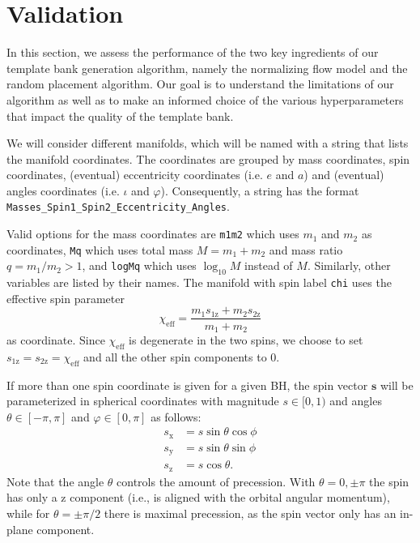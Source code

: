 \documentclass[twocolumn,showpacs,preprintnumbers,nofootinbib,prd,
superscriptaddress,10pt]{revtex4-2}
\begin{document}
\section{Validation} \label{sec:validation}

In this section, we assess the performance of the two key ingredients of our template bank generation algorithm, namely the normalizing flow model and the random placement algorithm.
Our goal is to understand the limitations of our algorithm as well as to make an informed choice of the various hyperparameters that impact the quality of the template bank.

We will consider different manifolds, which will be named with a string that lists the manifold coordinates. The coordinates are grouped by mass coordinates, spin coordinates, (eventual) eccentricity coordinates (i.e. $e$ and $a$) and (eventual) angles coordinates (i.e. $\iota$ and $\varphi$).
Consequently, a string has the format \texttt{Masses\_Spin1\_Spin2\_Eccentricity\_Angles}.

Valid options for the mass coordinates are \texttt{m1m2} which uses $m_1$ and $m_2$ as coordinates, \texttt{Mq} which uses total mass $M = m_1+m_2$ and mass ratio $q = m_1/m_2 >1$, and \texttt{logMq} which uses $\log_{10}M$ instead of $M$.
Similarly, other variables are listed by their names.
The manifold with spin label \texttt{chi} uses the effective spin parameter
%
\begin{equation}\label{eq:chieff}
	\chi_\text{eff} = \frac{m_1 s_\text{1z} + m_2 s_\text{2z}}{m_1 + m_2}
\end{equation}
%
as coordinate. Since $\chi_\text{eff}$ is degenerate in the two spins, we choose to set $s_\text{1z} = s_\text{2z} = \chi_\text{eff}$ and all the other spin components to $0$.

If more than one spin coordinate is given for a given BH, the spin vector $\mathbf{s}$ will be parameterized in spherical coordinates with magnitude ${s \in [0,1)}$ and angles ${\theta \in [-\pi,\pi]}$ and ${\varphi \in [0, \pi]}$ as follows:
%
\begin{align}
	s_\text{x} & = s \sin\theta \cos\phi \\
	s_\text{y} & = s \sin\theta \sin\phi \\
	s_\text{z} & = s \cos\theta.
\end{align}
%
Note that the angle $\theta$ controls the amount of precession. With $\theta = 0, \pm \pi$ the spin has only a z component (i.e., is aligned with the orbital angular momentum), while for $\theta = \pm\pi/2$ there is maximal precession, as the spin vector only has an in-plane component.
\end{document}

